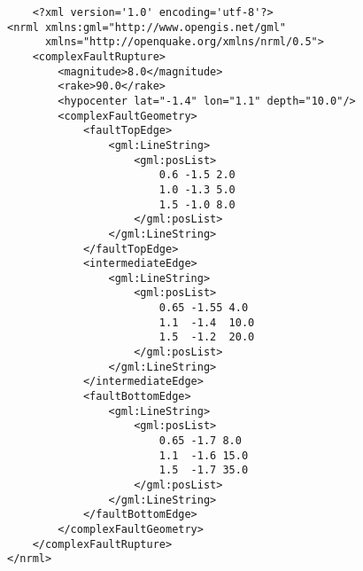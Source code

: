 \begin{enumerate}
\begin{verbatim}
    <?xml version='1.0' encoding='utf-8'?>
<nrml xmlns:gml="http://www.opengis.net/gml"
      xmlns="http://openquake.org/xmlns/nrml/0.5">
    <complexFaultRupture>
        <magnitude>8.0</magnitude>
        <rake>90.0</rake>
        <hypocenter lat="-1.4" lon="1.1" depth="10.0"/>
        <complexFaultGeometry>
            <faultTopEdge>
                <gml:LineString>
                    <gml:posList>
                        0.6 -1.5 2.0
                        1.0 -1.3 5.0
                        1.5 -1.0 8.0
                    </gml:posList>
                </gml:LineString>
            </faultTopEdge>
            <intermediateEdge>
                <gml:LineString>
                    <gml:posList>
                        0.65 -1.55 4.0
                        1.1  -1.4  10.0
                        1.5  -1.2  20.0
                    </gml:posList>
                </gml:LineString>
            </intermediateEdge>
            <faultBottomEdge>
                <gml:LineString>
                    <gml:posList>
                        0.65 -1.7 8.0
                        1.1  -1.6 15.0
                        1.5  -1.7 35.0
                    </gml:posList>
                </gml:LineString>
            </faultBottomEdge>
        </complexFaultGeometry>
    </complexFaultRupture>
</nrml>
\end{verbatim}
\end{enumerate}
